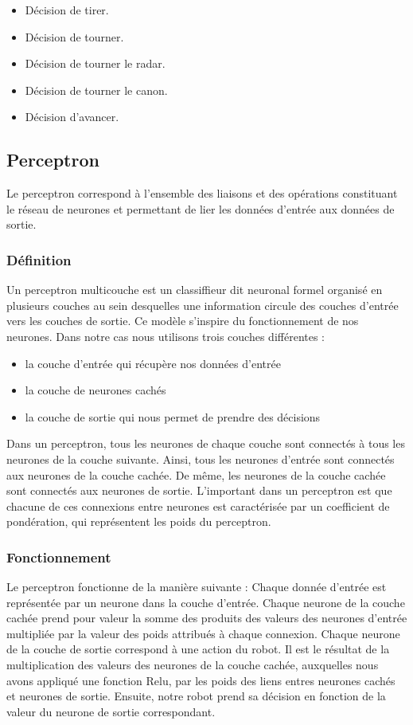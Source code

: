 \documentclass[12pt]{article}
\begin{document}
\begin{itemize}
\item Décision de tirer.
\item Décision de tourner.
\item Décision de tourner le radar.
\item Décision de tourner le canon.
\item Décision d'avancer.
\end{itemize}

\subsection{Perceptron}
Le perceptron correspond à l'ensemble des liaisons et des opérations constituant le réseau de neurones et permettant de lier les données d'entrée aux données de sortie.

\subsubsection{Définition}
Un perceptron multicouche est un classiffieur dit neuronal formel organisé en
plusieurs couches au sein desquelles une information circule des couches d'entrée
vers les couches de sortie. Ce modèle s'inspire du fonctionnement de nos neurones.
Dans notre cas nous utilisons trois couches différentes :

\begin{itemize}
\item la couche d'entrée qui récupère nos données d'entrée
\item la couche de neurones cachés
\item la couche de sortie qui nous permet de prendre des décisions
\end{itemize}

Dans un perceptron, tous les neurones de chaque couche sont connectés à tous les
neurones de la couche suivante. Ainsi, tous les neurones d'entrée sont connectés
aux neurones de la couche cachée. De même, les neurones de la couche cachée sont
connectés aux neurones de sortie. L'important dans un perceptron est que chacune
de ces connexions entre neurones est caractérisée par un coefficient de pondération,
qui représentent les poids du perceptron. 

\subsubsection{Fonctionnement}
Le perceptron fonctionne de la manière suivante :
Chaque donnée d'entrée est représentée par un neurone dans la couche d'entrée.
Chaque neurone de la couche cachée prend pour valeur la somme des produits des
valeurs des neurones d'entrée multipliée par la valeur des poids attribués à chaque
connexion.
Chaque neurone de la couche de sortie correspond à une action du robot. Il est le
résultat de la multiplication des valeurs des neurones de la couche cachée, auxquelles
nous avons appliqué une fonction Relu, par les poids des liens entres neurones cachés
et neurones de sortie.
Ensuite, notre robot prend sa décision en fonction de la valeur du neurone de sortie correspondant.
\end{document}
